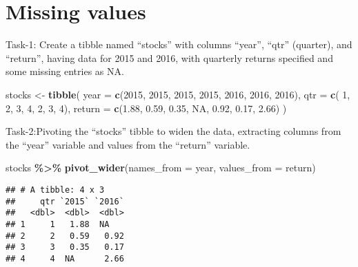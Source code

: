 \documentclass[
]{article}
\newenvironment{Shaded}{\begin{snugshade}}{\end{snugshade}}
\newcommand{\AttributeTok}[1]{\textcolor[rgb]{0.13,0.29,0.53}{#1}}
\newcommand{\ConstantTok}[1]{\textcolor[rgb]{0.56,0.35,0.01}{#1}}
\newcommand{\DecValTok}[1]{\textcolor[rgb]{0.00,0.00,0.81}{#1}}
\newcommand{\FloatTok}[1]{\textcolor[rgb]{0.00,0.00,0.81}{#1}}
\newcommand{\FunctionTok}[1]{\textcolor[rgb]{0.13,0.29,0.53}{\textbf{#1}}}
\newcommand{\NormalTok}[1]{#1}
\newcommand{\OtherTok}[1]{\textcolor[rgb]{0.56,0.35,0.01}{#1}}
\newcommand{\SpecialCharTok}[1]{\textcolor[rgb]{0.81,0.36,0.00}{\textbf{#1}}}
\begin{document}
\hypertarget{missing-values}{%
\section{Missing values}\label{missing-values}}

Task-1: Create a tibble named ``stocks'' with columns ``year'', ``qtr''
(quarter), and ``return'', having data for 2015 and 2016, with quarterly
returns specified and some missing entries as NA.

\begin{Shaded}
\begin{Highlighting}[]
\NormalTok{stocks }\OtherTok{\textless{}{-}} \FunctionTok{tibble}\NormalTok{(}
  \AttributeTok{year   =} \FunctionTok{c}\NormalTok{(}\DecValTok{2015}\NormalTok{, }\DecValTok{2015}\NormalTok{, }\DecValTok{2015}\NormalTok{, }\DecValTok{2015}\NormalTok{, }\DecValTok{2016}\NormalTok{, }\DecValTok{2016}\NormalTok{, }\DecValTok{2016}\NormalTok{),}
  \AttributeTok{qtr    =} \FunctionTok{c}\NormalTok{(   }\DecValTok{1}\NormalTok{,    }\DecValTok{2}\NormalTok{,    }\DecValTok{3}\NormalTok{,    }\DecValTok{4}\NormalTok{,    }\DecValTok{2}\NormalTok{,    }\DecValTok{3}\NormalTok{,    }\DecValTok{4}\NormalTok{),}
  \AttributeTok{return =} \FunctionTok{c}\NormalTok{(}\FloatTok{1.88}\NormalTok{, }\FloatTok{0.59}\NormalTok{, }\FloatTok{0.35}\NormalTok{,   }\ConstantTok{NA}\NormalTok{, }\FloatTok{0.92}\NormalTok{, }\FloatTok{0.17}\NormalTok{, }\FloatTok{2.66}\NormalTok{)}
\NormalTok{)}
\end{Highlighting}
\end{Shaded}

Task-2:Pivoting the ``stocks'' tibble to widen the data, extracting
columns from the ``year'' variable and values from the ``return''
variable.

\begin{Shaded}
\begin{Highlighting}[]
\NormalTok{stocks }\SpecialCharTok{\%\textgreater{}\%} 
  \FunctionTok{pivot\_wider}\NormalTok{(}\AttributeTok{names\_from =}\NormalTok{ year, }\AttributeTok{values\_from =}\NormalTok{ return)}
\end{Highlighting}
\end{Shaded}

\begin{verbatim}
## # A tibble: 4 x 3
##     qtr `2015` `2016`
##   <dbl>  <dbl>  <dbl>
## 1     1   1.88  NA   
## 2     2   0.59   0.92
## 3     3   0.35   0.17
## 4     4  NA      2.66
\end{verbatim}
\end{document}
